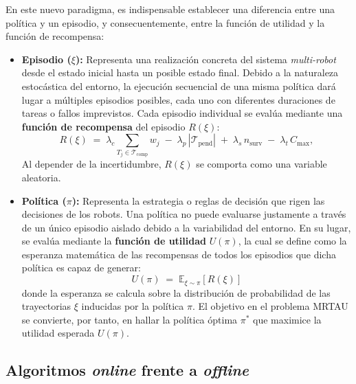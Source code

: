 En este nuevo paradigma, es indispensable establecer una diferencia entre una política y un episodio, y consecuentemente, entre la función de utilidad y la función de recompensa:
\begin{itemize}
    \item \textbf{Episodio ($\xi$):} Representa una realización concreta del sistema \textit{multi-robot} desde el estado inicial hasta un posible estado final. Debido a la naturaleza estocástica del entorno, la ejecución secuencial de una misma política dará lugar a múltiples episodios posibles, cada uno con diferentes duraciones de tareas o fallos imprevistos. Cada episodio individual se evalúa mediante una \textbf{función de recompensa} del episodio $R(\xi)$:
    \begin{equation} \label{eq:recompensa}
    R(\xi) \;=\; \lambda_c \sum_{T_j\in\mathcal{T}_{\mathrm{comp}}} w_j \;-\; \lambda_p\, |\mathcal{T}_{\mathrm{pend}}|   \;+\; \lambda_s\, n_{\mathrm{surv}}     \;-\; \lambda_t\, C_{\max}, 
    \end{equation}
    Al depender de la incertidumbre, $R(\xi)$ se comporta como una variable aleatoria.
    
    \item \textbf{Política ($\pi$):} Representa la estrategia o reglas de decisión que rigen las decisiones de los robots. Una política no puede evaluarse justamente a través de un único episodio aislado debido a la variabilidad del entorno. En su lugar, se evalúa mediante la \textbf{función de utilidad} $U(\pi)$, la cual se define como la esperanza matemática de las recompensas de todos los episodios que dicha política es capaz de generar:
    \begin{equation} \label{eq:utilidad_esperada}
    U(\pi) \;=\; \mathbb{E}_{\xi \sim \pi} \left[ R(\xi) \right]
    \end{equation}
    donde la esperanza se calcula sobre la distribución de probabilidad de las trayectorias $\xi$ inducidas por la política $\pi$. El objetivo en el problema MRTAU se convierte, por tanto, en hallar la política óptima $\pi^*$ que maximice la utilidad esperada $U(\pi)$.
\end{itemize}


\subsection{Algoritmos \textit{online} frente a \textit{offline}} \label{subsec:online-offline} %

